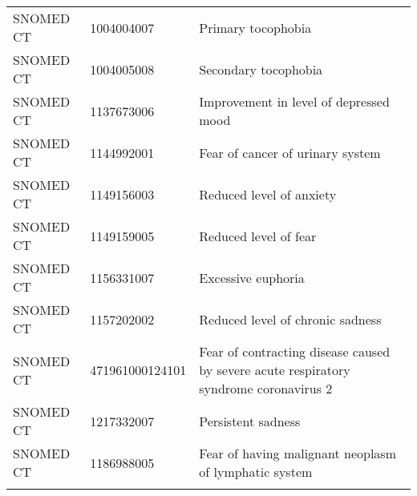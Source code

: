 \begin{longtable}{p{}p{}p{}}
  SNOMED CT & 1004004007 & Primary tocophobia \\ 
  SNOMED CT & 1004005008 & Secondary tocophobia \\ 
  SNOMED CT & 1137673006 & Improvement in level of depressed mood \\ 
  SNOMED CT & 1144992001 & Fear of cancer of urinary system \\ 
  SNOMED CT & 1149156003 & Reduced level of anxiety \\ 
  SNOMED CT & 1149159005 & Reduced level of fear \\ 
  SNOMED CT & 1156331007 & Excessive euphoria \\ 
  SNOMED CT & 1157202002 & Reduced level of chronic sadness \\ 
  SNOMED CT & 471961000124101 & Fear of contracting disease caused by severe acute respiratory syndrome coronavirus 2 \\ 
  SNOMED CT & 1217332007 & Persistent sadness \\ 
  SNOMED CT & 1186988005 & Fear of having malignant neoplasm of lymphatic system \\ 
  \hline
\label{tab:codes_mood_changes}
\end{longtable}

